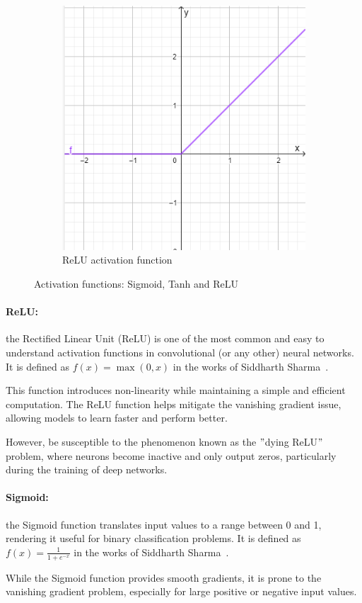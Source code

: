 \begin{figure}[h!]
\begin{subfigure}[b]{0.6\textwidth}
        \includegraphics[width=0.5\linewidth]{figures/normal_relu}
        \caption{ReLU activation function}
        \label{fig:relu}
    \end{subfigure}
    \caption{Activation functions: Sigmoid, Tanh and ReLU}
    \label{fig:activation_functions}
\end{figure}


\paragraph{ReLU:}\label{par:relu}
the Rectified Linear Unit (ReLU) is one of the most common and easy to understand activation functions in convolutional (or any other) neural networks.
It is defined as \( f(x) = \max(0, x) \) in the works of Siddharth Sharma~\cite{sharma2017activation}.

This function introduces non-linearity while maintaining a simple and efficient computation.
The ReLU function helps mitigate the vanishing gradient issue, allowing models to learn faster and perform better.

However, be susceptible to the phenomenon known as the \("\)dying ReLU\("\) problem, where neurons become inactive and only output zeros,
particularly during the training of deep networks.



\paragraph{Sigmoid:}\label{par:sigmoid}
the Sigmoid function translates input values to a range between 0 and 1,
rendering it useful for binary classification problems.
It is defined as \( f(x) = \frac{1}{1 + e^{-x}} \) in the works of Siddharth Sharma~\cite{sharma2017activation}.

While the Sigmoid function provides smooth gradients,
it is prone to the vanishing gradient problem,
especially for large positive or negative input values.

